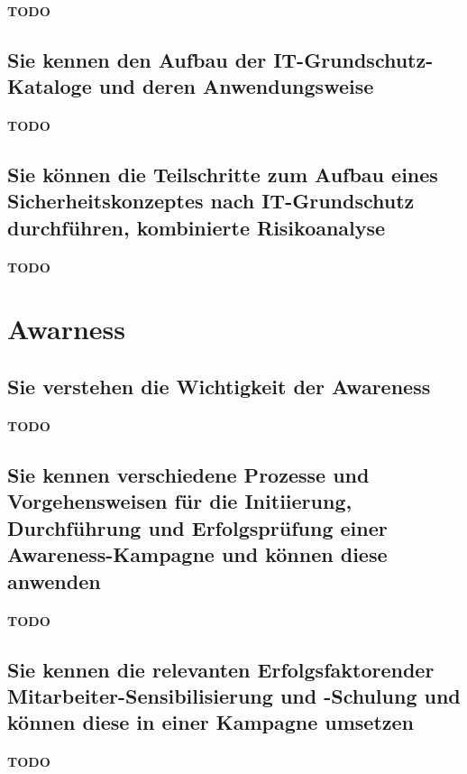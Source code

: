 \documentclass[10pt,a4paper]{article}
\begin{document}
\paragraph*{TODO}
\subsection*{Sie kennen den Aufbau der IT-Grundschutz-Kataloge und deren Anwendungsweise}
\paragraph*{TODO}
\subsection*{Sie können die Teilschritte zum Aufbau eines Sicherheitskonzeptes nach IT-Grundschutz durchführen, kombinierte Risikoanalyse}
\paragraph*{TODO}


\section{Awarness}
\subsection*{Sie verstehen die Wichtigkeit der \flqq Awareness \frqq}
\paragraph*{TODO}
\subsection*{Sie kennen verschiedene Prozesse und Vorgehensweisen für die Initiierung, Durchführung und Erfolgsprüfung einer Awareness-Kampagne und können diese anwenden}
\paragraph*{TODO}
\subsection*{Sie kennen die relevanten Erfolgsfaktorender Mitarbeiter-Sensibilisierung und -Schulung und können diese in einer Kampagne umsetzen}
\paragraph*{TODO}
\end{document}
